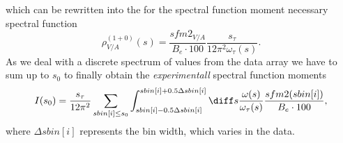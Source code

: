 which can be rewritten into the for the spectral function moment necessary spectral function
\begin{equation}
	\rho_{V/A}^{(1+0)}(s) = \frac{sfm2_{V/A}}{B_e \cdot 100} \frac{s_\tau}{12 \pi^2 \omega_\tau(s)}.
\end{equation}
As we deal with a discrete spectrum of values from the data array we have to sum up to $s_0$ to finally obtain the \textit{experimentall} spectral function moments
\begin{equation}
	I(s_0) = \frac{s_\tau}{12 \pi^2} \sum_{sbin[i] \leq s_0} \int_{sbin[i]- 0.5 \Delta sbin[i]}^{sbin[i] + 0.5 \Delta sbin[i]} \diff s \frac{\omega(s)}{\omega_\tau(s)} \frac{sfm2(sbin[i])}{B_e \cdot 100},
\end{equation}
where $\Delta sbin[i]$ represents the bin width, which varies in the data. 
	
	
	
	